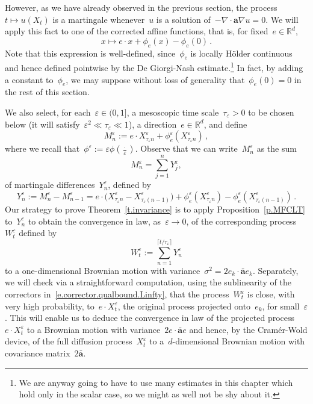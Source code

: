 \documentclass[11pt,twoside]{article} %
\numberwithin{equation}{section}
\theoremstyle{definition}
\newcommand*{\Rd}{\ensuremath{\mathbb{R}^d}}
\newcommand{\eps}{\varepsilon}
\newcommand{\ep}{\eps}
\renewcommand{\a}{\mathbf{a}}
\newcommand{\ahom}{\bar{\a}}
\begin{document}
\smallskip

However, as we have already observed in the previous section, the process~$t\mapsto u (X_t)$ is a martingale whenever~$u$ is a solution of~$-\nabla \cdot \a\nabla u = 0$. We will apply this fact to one of the corrected affine functions, that is, for fixed~$e \in\Rd$, 
\begin{equation*}
x\mapsto e \cdot x + \phi_{e}(x) - \phi_{e}(0)
\,.
\end{equation*}
Note that this expression is well-defined, since~$\phi_e$ is locally H\"older continuous and hence defined pointwise by the De Giorgi-Nash estimate.\footnote{We are anyway going to have to use many estimates in this chapter which hold only in the scalar case, so we might as well not be shy about it.} In fact, by adding a constant to~$\phi_e$, we may suppose without loss of generality that~$\phi_e(0)=0$ in the rest of this section. 

\smallskip

We also select, for each~$\ep \in (0,1]$, a mesoscopic time scale~$\tau_\ep >0$ to be chosen below (it will satisfy~$\ep^2 \ll \tau_\ep \ll 1$), 
a direction~$e \in\Rd$, and define
\begin{equation*}
M^\ep_n := e \cdot X^{\ep}_{\tau_\ep n} + \phi^\ep_{e}(X^{\ep}_{\tau_\ep n}) \,,
\end{equation*}
where we recall that~$\phi^\ep := \ep \phi(\frac \cdot \ep)$. 
Observe that we can write~$M^\ep_n$ as the sum 
\begin{equation*}
M^\ep_n = \sum_{j=1}^n Y^\ep_j, 
\end{equation*}
of martingale differences~$Y^\ep_n$, defined by
\begin{equation*}
Y^\ep_n := M^\ep_n - M^\ep_{n-1}
=
e\cdot \bigl( X^{\ep}_{{\tau_\ep}n} - X^{\ep}_{{\tau_\ep}(n-1)} \bigr)  
+ 
\phi^\ep_{e}(X^{\ep}_{{\tau_\ep}n}) - \phi^\ep_{e}(X^{\ep}_{{\tau_\ep}(n-1)})
\,.
\end{equation*}
Our strategy to prove Theorem~\ref{t.invariance} is to apply Proposition~\ref{p.MFCLT} to~$Y^{\ep}_n$ to obtain the convergence in law, as~$\ep\to0$, of the corresponding process~$W^\ep_t$ defined by
\begin{equation*}
W^\ep_t
:=
\sum_{n=1}^{\lceil t/\tau_\ep \rceil}
Y^\ep_n
\end{equation*}
to a one-dimensional Brownian motion with variance~$\sigma^2 = 2 e_k \cdot \ahom e_k$. 
Separately, we will check via a straightforward computation, using the sublinearity of the correctors in~\eqref{e.corrector.qualbound.Linfty}, that the process~$W^\ep_t$ is close, with very high probability, to~$e\cdot X^{\ep}_t$, the original process projected onto~$e_k$, for small~$\ep$. This will enable us to deduce the convergence in law of the projected process~$e \cdot X^{\ep}_t$ to a Brownian motion with variance~$2e\cdot \ahom e$ and hence, by the Cram\'er-Wold device, of the full diffusion process~$X^{\ep}_t$ to a~$d$-dimensional Brownian motion with covariance matrix~$2\ahom$. 
\end{document}
